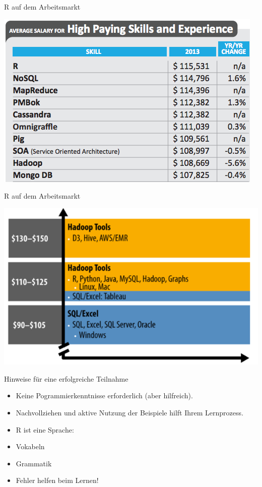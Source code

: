 \documentclass[ignorenonframetext,]{beamer}
\begin{document}
\begin{frame}{R auf dem Arbeitsmarkt}

\includegraphics{../fig/skills_earnings.png}

\end{frame}

\begin{frame}{R auf dem Arbeitsmarkt}

\includegraphics{../fig/skills_earnings_2.png}

\end{frame}

\begin{frame}{Hinweise für eine erfolgreiche Teilnahme}

\begin{itemize}
\itemsep1pt\parskip0pt
\item
  Keine Pogrammierkenntnisse erforderlich (aber hilfreich).
\item
  Nachvollziehen und aktive Nutzung der Beispiele hilft Ihrem
  Lernprozess.
\item
  R ist eine Sprache:
\item
  Vokabeln
\item
  Grammatik
\item
  Fehler helfen beim Lernen!
\end{itemize}

\end{frame}
\end{document}
